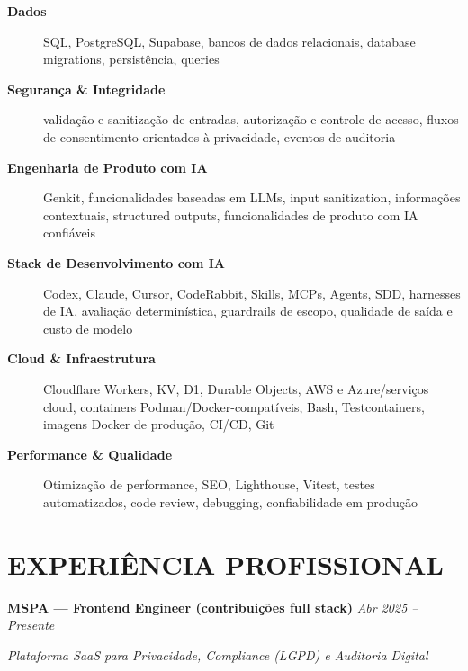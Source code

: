 \documentclass[10pt,a4paper]{article}
\begin{document}
\begin{description}
    \item[\textbf{Dados}]
    SQL, PostgreSQL, Supabase, bancos de dados relacionais,
    database migrations, persistência, queries

    \item[\textbf{Segurança \& Integridade}]
    validação e sanitização de entradas, autorização e controle de acesso,
    fluxos de consentimento orientados à privacidade, eventos de auditoria

    \item[\textbf{Engenharia de Produto com IA}]
    Genkit, funcionalidades baseadas em LLMs, input sanitization,
    informações contextuais, structured outputs,
    funcionalidades de produto com IA confiáveis

    \item[\textbf{Stack de Desenvolvimento com IA}]
    Codex, Claude, Cursor, CodeRabbit, Skills, MCPs,
    Agents, SDD, harnesses de IA, avaliação determinística,
    guardrails de escopo, qualidade de saída e custo de modelo
    \vspace{12pt}

    \item[\textbf{Cloud \& Infraestrutura}]
    Cloudflare Workers, KV, D1, Durable Objects,
    AWS e Azure/serviços cloud, containers Podman/Docker-compatíveis,
    Bash, Testcontainers, imagens Docker de produção, CI/CD, Git

    \item[\textbf{Performance \& Qualidade}]
    Otimização de performance, SEO, Lighthouse,
    Vitest, testes automatizados, code review,
    debugging, confiabilidade em produção

\end{description}


\section*{EXPERIÊNCIA PROFISSIONAL}

\noindent
\textbf{MSPA — Frontend Engineer (contribuições full stack)}
\hfill
\textit{Abr 2025 -- Presente}

\textit{Plataforma SaaS para Privacidade, Compliance (LGPD) e Auditoria Digital}
\end{document}
